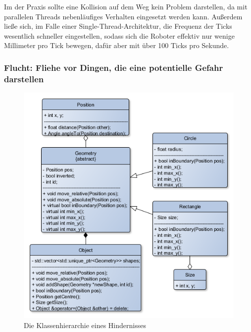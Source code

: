 Im der Praxis sollte eine Kollision auf dem Weg kein Problem darstellen, da mit parallelen Threads nebenläufiges Verhalten eingesetzt werden kann. Außerdem ließe sich, im Falle einer Single-Thread-Architektur, die Frequenz der Ticks wesentlich schneller eingestellen, sodass sich die Roboter effektiv nur wenige Millimeter pro Tick bewegen, dafür aber mit über 100 Ticks pro Sekunde.%

\subsubsection*{Flucht: Fliehe vor Dingen, die eine potentielle Gefahr darstellen}

\begin{figure}
	\includegraphics[width=\pictureWidthBig,keepaspectratio]{graphics/Klassendiagramme/KlassendiagrammObject.png}
	\caption{Die Klassenhierarchie eines Hindernisses}
	\label{pic:KlassendiagramObjekt}
\end{figure}

